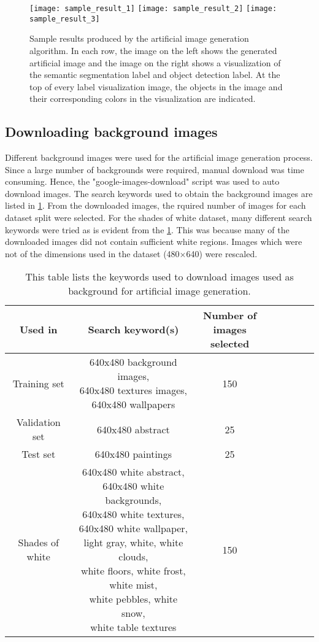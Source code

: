 \documentclass[paper=a4,11pt,parskip=half,toc=listof]{scrartcl}
\begin{document}
	\begin{figure}[htb!]
		\centering
		\texttt{[image: sample\_result\_1]}
		\texttt{[image: sample\_result\_2]}
		\texttt{[image: sample\_result\_3]}
		\caption{Sample results produced by the artificial image generation algorithm. In each row, the image on the left shows the generated artificial image and the image on the right shows a visualization of the semantic segmentation label and object detection label. At the top of every label visualization image, the objects in the image and their corresponding colors in the visualization are indicated.}
		\label{Fig:sample}
	\end{figure}
	
\subsection{Downloading background images}
Different background images were used for the artificial image generation process. Since a large number of backgrounds were required, manual download was time consuming. Hence, the "google-images-download" \cite{image_downloader} script was used to auto download images. The search keywords used to obtain the background images are listed in \ref{Table:download}. From the downloaded images, the rquired number of images for each dataset split were selected. For the shades of white dataset, many different search keywords were tried as is evident from the \ref{Table:download}. This was because many of the downloaded images did not contain sufficient white regions. Images which were not of the dimensions used in the dataset (480$\times$640) were rescaled.

\begin{table}[!htb]
	\centering
	\begin{tabular}{|c|c|c|c|c|c|c|c|}
	\hline 
    Used in & Search keyword(s) & \makecell{Number of \\images selected} \\ 
	\hline 
	Training set & \makecell{640x480 background images, \\640x480 textures images, \\640x480 wallpapers} & 150 \\ 
	\hline 
	Validation set & 640x480 abstract & 25 \\ 
	\hline 
	Test set & 640x480 paintings & 25 \\ 
	\hline 
	Shades of white & \makecell{640x480 white abstract, \\640x480 white backgrounds, \\640x480 white textures, \\640x480 white wallpaper, \\light gray, white, white clouds, \\white floors, white frost, white mist, \\white pebbles, white snow, \\white table textures} & 150 \\ 
	\hline 
	\end{tabular}
	\caption{This table lists the keywords used to download images used as background for artificial image generation.} 
	\label{Table:download}
\end{table}
\end{document}
